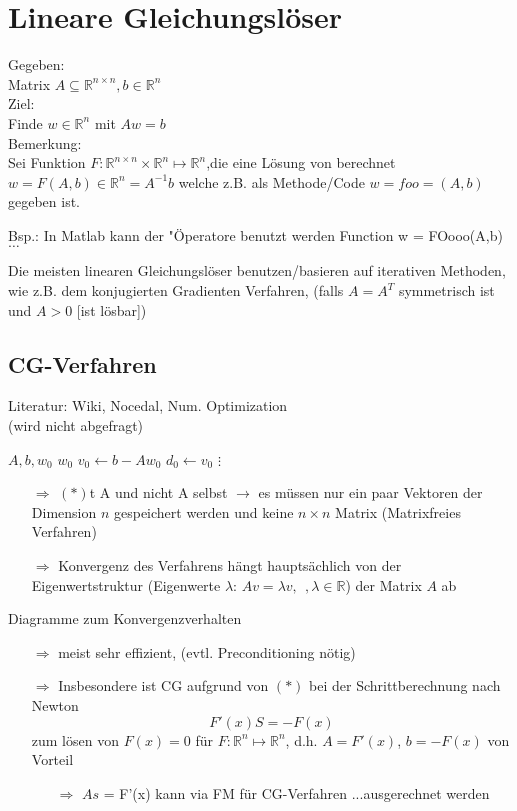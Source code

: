 \section{Lineare Gleichungslöser}
Gegeben:\\
Matrix $ A \subseteq \mathbb{R}^{n\times n}, b \in \mathbb{R}^n$\\
Ziel:\\
Finde $w\in \mathbb{R}^n$ mit $Aw=b$\\
Bemerkung:\\
Sei Funktion $F:\mathbb{R}^{n\times n} \times \mathbb{R}^n \mapsto \mathbb{R}^n$,die eine Lösung von berechnet $w=F(A,b)\in \mathbb{R}^n = A^{-1}b$
welche z.B. als  Methode/Code $w=foo=(A,b)$gegeben ist.

Bsp.: In Matlab kann der "\" Operatore benutzt werden
Function w = FOooo(A,b)
$\dots$



Die meisten linearen Gleichungslöser benutzen/basieren auf iterativen Methoden, wie z.B. dem konjugierten Gradienten Verfahren,
(falls $A=A^T$ symmetrisch ist und $A>0$ [ist lösbar])\\

\subsection{CG-Verfahren}
Literatur: Wiki, Nocedal, Num. Optimization\\
(wird nicht abgefragt)
\begin{algorithmic}
	\State $A,b,w_0$
	\State $w_0$
	\State $v_0 \gets b-Aw_0$
	\State $d_0 \gets v_0$
		\State $\vdots$
	\EndFor
\end{algorithmic}
\begin{itemize}
	\item[$\Rightarrow$] $(*)$t A und nicht A selbst $\rightarrow$ es müssen nur ein paar Vektoren der Dimension $n$ gespeichert werden und keine $n\times n$ Matrix (Matrixfreies Verfahren)
	\item[$\Rightarrow$] Konvergenz des Verfahrens hängt hauptsächlich von der Eigenwertstruktur (Eigenwerte $\lambda$: $Av = \lambda v,\ \ , \lambda \in \mathbb{R}$) der Matrix $A$ ab
\end{itemize}

Diagramme zum Konvergenzverhalten\\
\vspace{3cm}

\noindent
\begin{itemize}
	\item[$\Rightarrow$] meist sehr effizient, (evtl. Preconditioning nötig)
	\item[$\Rightarrow$] Insbesondere ist CG aufgrund von $(*)$ bei der Schrittberechnung nach Newton 
	$$F'(x)S = -F(x)$$
	zum lösen von $F(x)=0$ für $F:\mathbb{R}^n\mapsto\mathbb{R}^n$, d.h. $A=F'(x)$, $b=-F(x)$ von Vorteil
	\begin{itemize}
		\item[$\Rightarrow$] $As$ = F'(x) kann via FM für CG-Verfahren ...ausgerechnet werden
	\end{itemize} 
\end{itemize}

